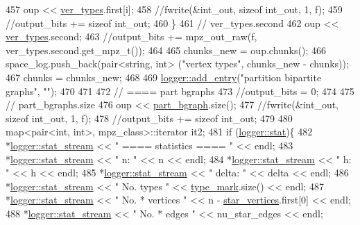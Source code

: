 \begin{DoxyCode}
457     oup <<  \hyperlink{classmarked__graph__compressed_af446cc5e23c241a92b76642fd5ebc403}{ver\_types}.first[i];
458     \textcolor{comment}{//fwrite(&int\_out, sizeof int\_out, 1, f);}
459     \textcolor{comment}{//output\_bits += sizeof int\_out;}
460   \}
461   \textcolor{comment}{// ver\_types.second}
462   oup << \hyperlink{classmarked__graph__compressed_af446cc5e23c241a92b76642fd5ebc403}{ver\_types}.second;
463   \textcolor{comment}{//output\_bits += mpz\_out\_raw(f, ver\_types.second.get\_mpz\_t());}
464 
465   chunks\_new = oup.chunks();
466   space\_log.push\_back(pair<string, int> (\textcolor{stringliteral}{"vertex types"}, chunks\_new - chunks));
467   chunks = chunks\_new;
468 
469   \hyperlink{classlogger_a710163deb17bc81f70d53d285b8ac9ac}{logger::add\_entry}(\textcolor{stringliteral}{"partition bipartite graphs"}, \textcolor{stringliteral}{""});
470   
471 
472   \textcolor{comment}{// ==== part bgraphs}
473   \textcolor{comment}{//output\_bits = 0;}
474 
475   \textcolor{comment}{// part\_bgraphs.size}
476   oup << \hyperlink{classmarked__graph__compressed_a7b3267063fba30b45eb21b3ba4e07536}{part\_bgraph}.size();
477   \textcolor{comment}{//fwrite(&int\_out, sizeof int\_out, 1, f);}
478   \textcolor{comment}{//output\_bits += sizeof int\_out;}
479 
480   map<pair<int, int>, mpz\_class>::iterator it2;
481   \textcolor{keywordflow}{if} (\hyperlink{classlogger_a26812b5ba03f130e8dae3446d5fc032f}{logger::stat})\{
482     *\hyperlink{classlogger_a7db37821f875f2ba3540980b355779f5}{logger::stat\_stream} << \textcolor{stringliteral}{" ==== statistics ==== "} << endl;
483     *\hyperlink{classlogger_a7db37821f875f2ba3540980b355779f5}{logger::stat\_stream} << \textcolor{stringliteral}{" n:                "} << n << endl;
484     *\hyperlink{classlogger_a7db37821f875f2ba3540980b355779f5}{logger::stat\_stream} << \textcolor{stringliteral}{" h:                "} << h << endl;
485     *\hyperlink{classlogger_a7db37821f875f2ba3540980b355779f5}{logger::stat\_stream} << \textcolor{stringliteral}{" delta:            "} << delta << endl;
486     *\hyperlink{classlogger_a7db37821f875f2ba3540980b355779f5}{logger::stat\_stream} << \textcolor{stringliteral}{" No. types         "} << 
      \hyperlink{classmarked__graph__compressed_a86b00223525703e973415cbc9c94da68}{type\_mark}.size() << endl;
487     *\hyperlink{classlogger_a7db37821f875f2ba3540980b355779f5}{logger::stat\_stream} << \textcolor{stringliteral}{" No. * vertices    "} << n - 
      \hyperlink{classmarked__graph__compressed_a7a4ced4586e2e353f9076bd447df5208}{star\_vertices}.first[0] << endl;
488     *\hyperlink{classlogger_a7db37821f875f2ba3540980b355779f5}{logger::stat\_stream} << \textcolor{stringliteral}{" No. * edges       "} << nu\_star\_edges << endl;

\end{DoxyCode}

